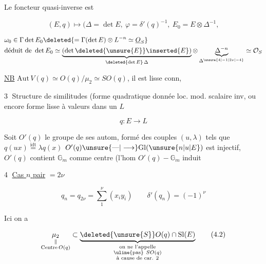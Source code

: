 Le foncteur quasi-inverse est

\[
 (E,q)\longmapsto\bigl(\Delta=\det E,\ \varphi=\delta'(q)^{-1},\ E_0=E\otimes\Delta^{-1},
\]


\[
 \begin{aligned}
 &\omega_0\in\Gamma\det E_0\deleted{=\Gamma(\det E)\otimes L^{-n}\simeq\underline O_S}\\
 &\text{déduit de }\det E_0\simeq
 \underbrace{(\det \deleted{\unsure{E}}\inserted{E})}_{\deleted{\det E}\,\Delta}\otimes
 \underbrace{\Delta^{-n}}_{\Delta^{\unsure{4|-1|2\nu|-4}}}\simeq\mathcal O_S
 \end{aligned}
\]

\uline{NB} $\mathrm{Aut}\,V(q)\simeq O(q)/\mu_2\simeq SO(q)$, il est lisse conn,

\quad{}

\textcircled{3} Structure de similitudes (forme quadratique  donnée loc. mod. scalaire inv, ou encore forme lisse à valeurs dans un $L$

\[
 q:E\longrightarrow L
\]

Soit $O'(q)$ le groupe de ses autom,  formé des couples $(u,\lambda)$ tels que $q(ux)\overset{\mathrm{idt}}{=}\lambda q(x)$  $O'(q)\unsure{\text{---}|\longrightarrow}\mathrm{Gl}(\unsure{n|u|E})$ est injectif, $O'(q)$ contient $\mathbb G_m$ comme centre (l'hom $O'(q)\mathbin{-}\mathbb G_m$ induit


\textcircled{4} \uline{Cas $n$ pair} $=2\nu$

\[
 q_n=q_{2\nu}=\sum_1^\nu(x_i y_i)\qquad \delta'(q_n)=(-1)^\nu\tag*{(4.1)}
\]

 Ici on a

\[
 \underset{\substack{\parallel\\\mathrm{Centre}\,O(q)}}{\mu_2}
 \subset\underbrace{\deleted{\unsure{S}}O(q)\cap\mathrm{Sl}(E)}_{
 \substack{\text{on ne l'appelle}\\\text{\uline{pas}}\ SO(q)\\\text{à cause de car. }2}}
 \tag*{(4.2)}
\]

